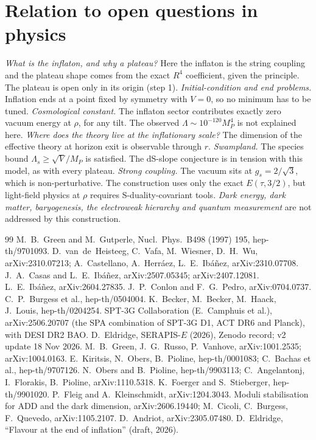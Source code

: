 \documentclass[aps,prd,twocolumn,superscriptaddress,nofootinbib,showkeys]{revtex4-2}
\begin{document}
\section{Relation to open questions in physics}
\emph{What is the inflaton, and why a plateau?} Here the inflaton is the string coupling and the plateau shape comes from the exact $R^4$ coefficient, given the principle. The plateau is open only in its origin (step 1).
\emph{Initial-condition and end problems.} Inflation ends at a point fixed by symmetry with $V=0$, so no minimum has to be tuned.
\emph{Cosmological constant.} The inflaton sector contributes exactly zero vacuum energy at $\rho$, for any tilt. The observed $\Lambda\sim10^{-120}M_P^4$ is not explained here.
\emph{Where does the theory live at the inflationary scale?} The dimension of the effective theory at horizon exit is observable through $r$.
\emph{Swampland.} The species bound $\Lambda_s\ge\sqrt V/M_P$ is satisfied. The dS-slope conjecture is in tension with this model, as with every plateau.
\emph{Strong coupling.} The vacuum sits at $g_s=2/\sqrt3$, which is non-perturbative. The construction uses only the exact $E(\tau,3/2)$, but light-field physics at $\rho$ requires S-duality-covariant tools.
\emph{Dark energy, dark matter, baryogenesis, the electroweak hierarchy and quantum measurement} are not addressed by this construction.

\begin{thebibliography}{99}
 M.~B.~Green and M.~Gutperle, Nucl.~Phys.~B498 (1997) 195, hep-th/9701093.
 D.~van~de~Heisteeg, C.~Vafa, M.~Wiesner, D.~H.~Wu, arXiv:2310.07213; A.~Castellano, A.~Herr\'aez, L.~E.~Ib\'a\~nez, arXiv:2310.07708.
 J.~A.~Casas and L.~E.~Ib\'a\~nez, arXiv:2507.05345; arXiv:2407.12081.
 L.~E.~Ib\'a\~nez, arXiv:2604.27835.
 J.~P.~Conlon and F.~G.~Pedro, arXiv:0704.0737.
 C.~P.~Burgess et al., hep-th/0504004.
 K.~Becker, M.~Becker, M.~Haack, J.~Louis, hep-th/0204254.
 SPT-3G Collaboration (E.~Camphuis et al.), arXiv:2506.20707 (the SPA combination of SPT-3G D1, ACT DR6 and Planck), with DESI DR2 BAO.
 D.~Eldridge, SERAPIS-$E$ (2026), Zenodo record; v2 update 18 Nov 2026.
 M.~B.~Green, J.~G.~Russo, P.~Vanhove, arXiv:1001.2535; arXiv:1004.0163.
 E.~Kiritsis, N.~Obers, B.~Pioline, hep-th/0001083; C.~Bachas et al., hep-th/9707126.
 N.~Obers and B.~Pioline, hep-th/9903113; C.~Angelantonj, I.~Florakis, B.~Pioline, arXiv:1110.5318.
 K.~Foerger and S.~Stieberger, hep-th/9901020.
 P.~Fleig and A.~Kleinschmidt, arXiv:1204.3043.
 Moduli stabilisation for ADD and the dark dimension, arXiv:2606.19440; M.~Cicoli, C.~Burgess, F.~Quevedo, arXiv:1105.2107.
 D.~Andriot, arXiv:2305.07480.
 D.~Eldridge, ``Flavour at the end of inflation'' (draft, 2026).
\end{thebibliography}
\end{document}
